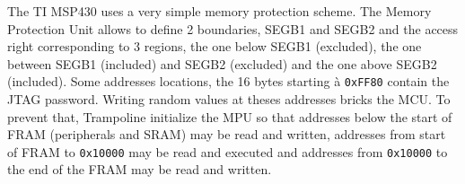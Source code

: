 \documentclass[11pt, oneside]{article}   	%
\begin{document}
The TI MSP430 uses a very simple memory protection scheme. The Memory Protection Unit allows to define 2 boundaries, SEGB1 and SEGB2 and the access right corresponding to 3 regions, the one below SEGB1 (excluded), the one between SEGB1 (included) and SEGB2 (excluded) and the one above SEGB2 (included). Some addresses locations, the 16 bytes starting à \lstinline{0xFF80} contain the JTAG password. Writing random values at theses addresses bricks the MCU. To prevent that, Trampoline initialize the MPU so that addresses below the start of FRAM (peripherals and SRAM) may be read and written, addresses from start of FRAM to \lstinline{0x10000} may be read and executed and addresses from \lstinline{0x10000} to the end of the FRAM may be read and written.



\end{document}
